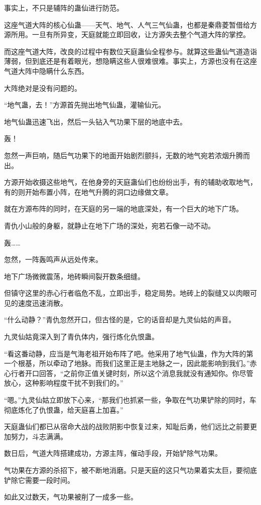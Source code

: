 \begin{this_body}
事实上，不只是辅阵的蛊仙进行防范。

这座气道大阵的核心仙蛊——天气、地气、人气三气仙蛊，也都是秦鼎菱暂借给方源所用。一旦有所异变，天庭就能立即回收，让方源失去整个气道大阵的掌控。

而这座气道大阵，改良的过程中有数位天庭蛊仙全程参与。就算这些蛊仙气道造诣薄弱，但到底还是有着眼光，想隐瞒这些人很难很难。事实上，方源也没有在这座气道大阵中隐瞒什么东西。

大阵绝对是没有问题的。

“地气蛊，去！”方源首先抛出地气仙蛊，灌输仙元。

地气仙蛊迅速飞出，然后一头钻入气功果下层的地底中去。

轰！

忽然一声巨响，随后气功果下的地面开始剧烈颤抖，无数的地气宛若浓烟升腾而出。

方源开始收摄这些地气，在他身旁的天庭蛊仙们也纷纷出手，有的辅助收取地气，有的则开始布置小阵，在地气升腾的洞口边缘做文章。

就在方源布阵的同时，在天庭的另一端的地底深处，有一个巨大的地下广场。

青仇小山般的身躯，就静止在地下广场的深处，宛若石像一动不动。

轰……

忽然，一阵轰鸣声从远处传来。

地下广场微微震荡，地砖瞬间裂开数条细缝。

但镇守这里的赤心行者临危不乱，立即出手，稳定局势。地砖上的裂缝又以肉眼可见的速度迅速消散。

“什么动静？”青仇忽然开口，但古怪的是，它的话音却是九灵仙姑的声音。

九灵仙姑竟深入到了青仇体内，强行炼化仇恨蛊。

“看这番动静，应当是气海老祖开始布阵了吧。他采用了地气仙蛊，作为大阵的第一个根基，所以牵动了地脉。而我们这里正是主地脉之一，因此能影响到我们。”赤心行者开口回答，“之前你正值关键时刻，所以这个消息我就没有通知你。你尽管放心，这种影响程度干扰不到我们的。”

“嗯。”九灵仙姑立即放下心来，“那我们也抓紧一些，争取在气功果铲除的同时，车彻底炼化了仇恨蛊，给天庭喜上加喜。”

天庭蛊仙们都已从宿命大战的战败阴影中恢复过来，知耻后勇，他们远比之前要更加努力，斗志满满。

数日后，气道大阵搭建成功，方源主阵，催动手段，开始铲除气功果。

气功果在方源的杀招下，被不断地消磨。只是天庭的这只气功果着实太巨，要彻底铲除它需要一段时间。

如此又过数天，气功果被削了一成多一些。


\end{this_body}
